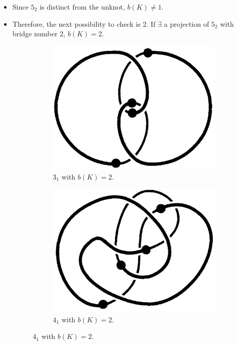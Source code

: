 \documentclass[titlepage]{article}
\numberwithin{figure}{section}
\numberwithin{table}{section}
\numberwithin{equation}{section}
\begin{document}
\begin{itemize}
    \begin{itemize}
        \item Since $5_2$ is distinct from the unknot, $b(K)\neq 1$.
        \item Therefore, the next possibility to check is 2. If $\exists$ a projection of $5_2$ with bridge number 2, $b(K)=2$.
        \begin{figure}[h!]
            \centering
            \begin{subfigure}[b]{0.2\linewidth}
                \centering
                \includegraphics[width=0.8\linewidth]{Blender/ex3-11a.png}
                \caption{$3_1$ with $b(K)=2$.}
                \label{fig:ex3-11a}
            \end{subfigure}
            \begin{subfigure}[b]{0.2\linewidth}
                \centering
                \includegraphics[width=0.8\linewidth]{Blender/ex3-11b.png}
                \caption{$4_1$ with $b(K)=2$.}
                \label{fig:ex3-11b}
            \end{subfigure}

\end{figure}
\end{itemize}
\end{itemize}
\end{document}
